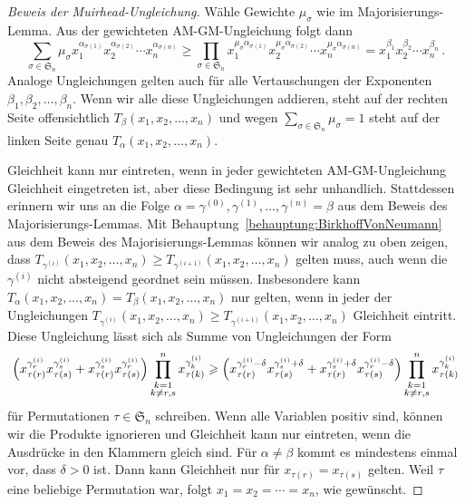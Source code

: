 \begin{proof}[Beweis der Muirhead-Ungleichung]
	Wähle Gewichte $\mu_\sigma$ wie im Majorisierungs-Lemma. Aus der gewichteten AM-GM-Ungleichung folgt dann
	\begin{equation*}
		\sum_{\sigma\in\mathfrak S_n}\mu_\sigma x_{1}^{\alpha_{\sigma(1)}}x_{2}^{\alpha_{\sigma(2)}}\dotsm x_{n}^{\alpha_{\sigma(n)}}\geqslant \prod_{\sigma\in\mathfrak S_n} x_1^{\mu_\sigma \alpha_{\sigma(1)}}x_2^{\mu_\sigma \alpha_{\sigma(2)}}\dotsm x_n^{\mu_\sigma \alpha_{\sigma(n)}}=x_1^{\beta_1}x_2^{\beta_2}\dotsm x_n^{\beta_n}\,.
	\end{equation*}
	Analoge Ungleichungen gelten auch für alle Vertauschungen der Exponenten $\beta_1,\beta_2,\dotsc,\beta_n$. Wenn wir alle diese Ungleichungen addieren, steht auf der rechten Seite offensichtlich $T_\beta(x_1,x_2,\dotsc,x_n)$ und wegen $\sum_{\sigma\in\mathfrak S_n}\mu_\sigma=1$ steht auf der linken Seite genau $T_\alpha(x_1,x_2,\dotsc,x_n)$.
	
	Gleichheit kann nur eintreten, wenn in jeder gewichteten AM-GM-Ungleichung Gleichheit eingetreten ist, aber diese Bedingung ist sehr unhandlich. Stattdessen erinnern wir uns an die Folge $\alpha=\gamma^{(0)},\gamma^{(1)}, \dotsc,\gamma^{(n)}=\beta$ aus dem Beweis des Majorisierungs-Lemmas. Mit Behauptung~\ref{behauptung:BirkhoffVonNeumann} aus dem Beweis des Majorisierungs-Lemmas können wir analog zu oben zeigen, dass $T_{\gamma^{(i)}}(x_1,x_2,\dotsc,x_n)\geqslant T_{\gamma^{(i+1)}}(x_1,x_2,\dotsc,x_n)$ gelten muss, auch wenn die $\gamma^{(i)}$ nicht absteigend geordnet sein müssen. Insbesondere kann $T_\alpha(x_1,x_2,\dotsc,x_n)=T_\beta(x_1,x_2,\dotsc,x_n)$ nur gelten, wenn in jeder der Ungleichungen $T_{\gamma^{(i)}}(x_1,x_2,\dotsc,x_n)\geqslant T_{\gamma^{(i+1)}}(x_1,x_2,\dotsc,x_n)$ Gleichheit eintritt. Diese Ungleichung lässt sich als Summe von Ungleichungen der Form
	\begin{equation*}
		\parens*{x_{\tau(r)}^{\gamma_r^{(i)}}x_{\tau(s)}^{\gamma_s^{(i)}}+x_{\tau(r)}^{\gamma_s^{(i)}}x_{\tau(s)}^{\gamma_r^{(i)}}}\prod_{\substack{k=1\\k\neq r,s}}^nx_{\tau(k)}^{\gamma_k^{(i)}}\geqslant \parens*{x_{\tau(r)}^{\gamma_r^{(i)}-\delta}x_{\tau(s)}^{\gamma_s^{(i)}+\delta}+x_{\tau(r)}^{\gamma_s^{(i)}+\delta}x_{\tau(s)}^{\gamma_r^{(i)}-\delta}}\prod_{\substack{k=1\\k\neq r,s}}^nx_{\tau(k)}^{\gamma_k^{(i)}}
	\end{equation*}
	für Permutationen $\tau\in \mathfrak S_n$ schreiben. Wenn alle Variablen positiv sind, können wir die Produkte ignorieren und Gleichheit kann nur eintreten, wenn die Ausdrücke in den Klammern gleich sind. Für $\alpha\neq \beta$ kommt es mindestens einmal vor, dass $\delta>0$ ist. Dann kann Gleichheit nur für $x_{\tau(r)}=x_{\tau(s)}$ gelten. Weil $\tau$ eine beliebige Permutation war, folgt $x_1=x_2=\dotsb=x_n$, wie gewünscht.
\end{proof}

